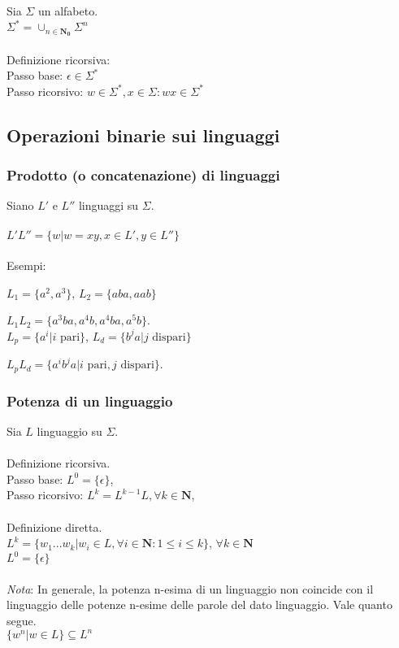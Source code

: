 \documentclass[]{article}
\begin{document}
Sia \mbox{$ \Sigma $} un alfabeto.
\\
\mbox{$ \Sigma^* = \cup_{n \in \mathbf{N_0}}{\Sigma^n} $}
\\
\\
Definizione ricorsiva:
\\
Passo base: \mbox{$ \epsilon \in \Sigma^* $}
\\
Passo ricorsivo: \mbox{$ w \in \Sigma^*, x \in \Sigma \colon wx \in \Sigma^* $}


\newpage
\subsection{Operazioni binarie sui linguaggi}


\subsubsection{Prodotto (o concatenazione) di linguaggi}

Siano \mbox{$ L' $} e \mbox{$ L'' $} linguaggi su \mbox{$ \Sigma $}.
\\
\\
\mbox{$ L' L'' = \{ w | w = xy, x \in L', y \in L'' \} $}
\\
\\
Esempi:

\mbox{$ L_1 = \{ a^2, a^3 \} $}, \mbox{$ L_2 = \{ aba, aab \} $}

\mbox{$ L_1 L_2 = \{ a^3ba, a^4b, a^4ba, a^5b \} $}.
\\

\mbox{$ L_p = \{ a^i | i \text{ pari} \} $}, \mbox{$ L_d = \{ b^ja | j \text{ dispari} \} $}

\mbox{$ L_p L_d = \{ a^ib^ja | i \text{ pari}, j \text{ dispari} \} $}.



\subsubsection{Potenza di un linguaggio}

Sia \mbox{$ L $} linguaggio su \mbox{$ \Sigma $}.
\\
\\
Definizione ricorsiva.
\\
Passo base: \mbox{$ L^0 = \{ \epsilon \} $},
\\
Passo ricorsivo: \mbox{$ L^k = L^{k-1} L, \forall k \in \mathbf{N} $},
\\
\\
Definizione diretta.
\\
\mbox{$ L^k = \{ w_1...w_k | w_i \in L, \forall i \in \mathbf{N} \colon 1 \le i \le k\} $}, \mbox{$ \forall k \in \mathbf{N} $}
\\
\mbox{$ L^0 = \{ \epsilon \} $}
\\
\\
\textit{Nota}: In generale, la potenza n-esima di un linguaggio non coincide
con il linguaggio delle potenze n-esime delle parole del dato linguaggio.
Vale quanto segue.
\\
\mbox{$ \{ w^n | w \in L \} \subseteq L^n $}
\end{document}
